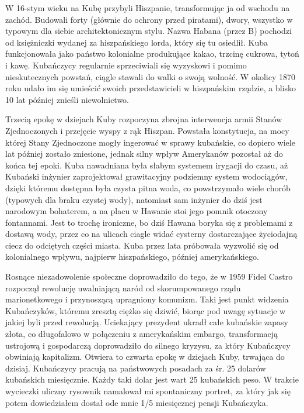 \par W 16-stym wieku na Kubę przybyli Hiszpanie, transformując ja od wschodu na zachód.
Budowali forty (głównie do ochrony przed piratami), dwory, wszystko w typowym dla siebie architektonicznym stylu.
Nazwa Habana (przez B) pochodzi od księżniczki wydanej za hiszpańskiego lorda, który się tu osiedlił.
Kuba funkcjonowała jako państwo kolonialne produkujące kakao, trzcinę cukrowa, tytoń i kawę.
Kubańczycy regularnie sprzeciwiali się wyzyskowi i pomimo nieskutecznych powstań, ciągle stawali do walki o swoją wolność. 
W okolicy 1870 roku udało im się umieścić swoich przedstawicieli w hiszpańskim rządzie, a blisko 10 lat później znieśli niewolnictwo.
\par Trzecią epokę w dziejach Kuby rozpoczyna zbrojna interwencja armii Stanów Zjednoczonych i przejęcie wyspy z rąk Hiszpan.
Powstała konstytucja, na mocy której Stany Zjednoczone mogły ingerować w sprawy kubańskie, co dopiero wiele lat później zostało zniesione, jednak silny wpływ Amerykanów pozostał aż do końca tej epoki.
Kuba nawadniana była słabym systemem irygacji do czasu, aż Kubański inżynier zaprojektował grawitacyjny podziemny system wodociągów, dzięki któremu dostępna była czysta pitna woda, co powstrzymało wiele chorób (typowych dla braku czystej wody), natomiast sam inżynier do dziś jest narodowym bohaterem, a na placu w Hawanie stoi jego pomnik otoczony fontannami.
Jest to trochę ironiczne, bo dziś Hawana boryka się z problemami z dostawą wody, przez co na ulicach ciagle widać cysterny dostarczające życiodajną ciecz do odciętych części miasta.
Kuba przez lata próbowała wyzwolić się od kolonialnego wpływu, najpierw hiszpańskiego, później amerykańskiego.
\par Rosnące niezadowolenie społeczne doprowadziło do tego, że w 1959 Fidel Castro rozpoczął rewolucję uwalniającą naród od skorumpowanego rządu marionetkowego i przynoszącą upragniony komunizm.
Taki jest punkt widzenia Kubańczyków, któremu zresztą ciężko się dziwić, biorąc pod uwagę sytuacje w jakiej byli przed rewolucją.
Uciekający prezydent ukradł całe kubańskie zapasy złota, co długofalowo w połączeniu z amerykańskim embargo, transformacją ustrojową i gospodarczą doprowadziło do silnego kryzysu, za który Kubańczycy obwiniają kapitalizm.
Otwiera to czwarta epokę w dziejach Kuby, trwająca do dzisiaj.
Kubańczycy pracują na państwowych posadach za śr.
25 dolarów kubańskich miesięcznie.
Każdy taki dolar jest wart 25 kubańskich peso.
W trakcie wycieczki uliczny rysownik namalował mi spontaniczny portret, za który jak się potem dowiedziałem dostał ode mnie 1/5 miesięcznej pensji Kubańczyka.
